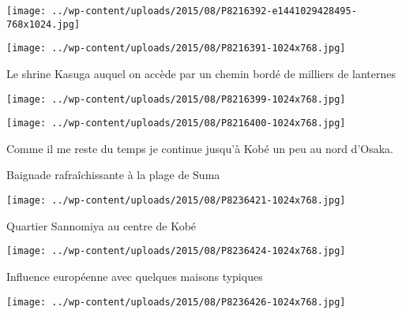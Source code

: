  

 

\begin{center} \texttt{[image: ../wp-content/uploads/2015/08/P8216392-e1441029428495-768x1024.jpg]} \end{center}

 

 

\begin{center} \texttt{[image: ../wp-content/uploads/2015/08/P8216391-1024x768.jpg]} \end{center}

 

 Le shrine Kasuga auquel on accède par un chemin bordé de milliers de lanternes 

 

\begin{center} \texttt{[image: ../wp-content/uploads/2015/08/P8216399-1024x768.jpg]} \end{center}

 

 

\begin{center} \texttt{[image: ../wp-content/uploads/2015/08/P8216400-1024x768.jpg]} \end{center}

 

 Comme il me reste du temps je continue jusqu'à Kobé un peu au nord d'Osaka. 

 Baignade rafraîchissante à la plage de Suma 

 

\begin{center} \texttt{[image: ../wp-content/uploads/2015/08/P8236421-1024x768.jpg]} \end{center}

 

 Quartier Sannomiya au centre de Kobé 

 

\begin{center} \texttt{[image: ../wp-content/uploads/2015/08/P8236424-1024x768.jpg]} \end{center}

 

 Influence européenne avec quelques maisons typiques 

 

\begin{center} \texttt{[image: ../wp-content/uploads/2015/08/P8236426-1024x768.jpg]} \end{center}

